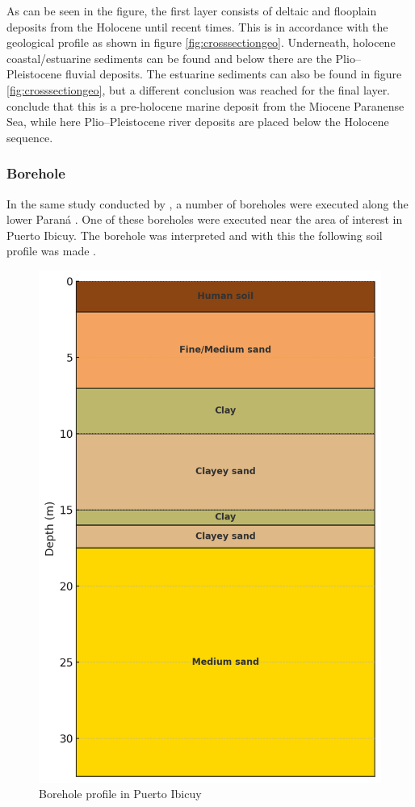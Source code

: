 As can be seen in the figure, the first layer consists of deltaic and flooplain deposits from the Holocene until recent times. This is in accordance with the geological profile as shown in figure \ref{fig:crosssectiongeo}. Underneath, holocene coastal/estuarine sediments can be found and below there are the Plio–Pleistocene fluvial deposits. The estuarine sediments can also be found in figure \ref{fig:crosssectiongeo}, but a different conclusion was reached for the final layer. \citeauthor{joseluiscavallottoEvolucionCambiosAmbientales2005} conclude that this is a pre-holocene marine deposit from the Miocene Paranense Sea, while here Plio–Pleistocene river deposits are placed below the Holocene sequence.

\subsubsection{Borehole}
In the same study conducted by \citeauthor{amatoESTRATIGRAFIACUATERNARIASUBSUELO2009}, a number of boreholes were executed along the lower Paraná \autocite{amatoESTRATIGRAFIACUATERNARIASUBSUELO2009}. One of these boreholes were executed near the area of interest in Puerto Ibicuy. The borehole was interpreted and with this the following soil profile was made  \autocite{amatoESTRATIGRAFIACUATERNARIASUBSUELO2009}.

\begin{figure}[H]
    \centering
    \includegraphics[width=0.45\linewidth]{figures//ch9/Bodemprofiel.png}
    \caption{Borehole profile in Puerto Ibicuy \autocite{amatoESTRATIGRAFIACUATERNARIASUBSUELO2009}}
    \label{fig:borehole}
\end{figure}

